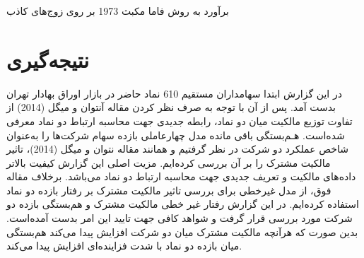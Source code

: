 \documentclass[12pt]{article}
\begin{document}
\begin{table}[htbp]
\centering
\begin{LTR}
\lr{
   \resizebox{\textwidth}{!}{
   
   }
   }
\end{LTR}
\caption{ برآورد به روش فاما مکبث 1973 بر روی زوج‌های کاذب}
\label{t20}
\end{table}


\FloatBarrier



\section{نتیجه‌گیری}
در این گزارش ابتدا سهامداران مستقیم 610 نماد حاضر در بازار اوراق بهادار تهران بدست آمد. پس از آن با توجه به صرف نظر کردن مقاله آنتوان و میگل (2014)
از تفاوت توزیع مالکیت میان دو نماد، رابطه جدیدی جهت محاسبه ارتباط دو نماد معرفی شده‌است. هـم‌بستگی
باقی مانده مدل چهارعاملی بازده سهام شرکت‌ها را به‌عنوان  شاخص عملكرد دو شرکت در نظر گرفتیم و همانند مقاله  
نتوان و میگل (2014)، تاثیر مالکیت مشترک را بر آن بررسی کرده‌ایم. مزیت اصلی این گزارش کیفیت بالاتر داده‌های مالکیت و تعریف جدیدی جهت محاسبه ارتباط دو نماد می‌باشد. برخلاف مقاله فوق، از مدل غیرخطی برای بررسی تاثیر مالکیت مشترک بر رفتار بازده دو نماد استفاده کرده‌ایم. در این گزارش رفتار غیر خطی مالکیت مشترک و هم‌بستگی بازده دو شرکت مورد بررسی قرار گرفت و شواهد کافی جهت تایید این امر بدست آمده‌است. بدین صورت که هرآنچه مالکیت مشترک میان دو شرکت افزایش پیدا می‌کند هم‌بستگی میان بازده دو نماد با شدت فزاینده‌ای افزایش پیدا می‌کند. 

 





\FloatBarrier
\end{document}
